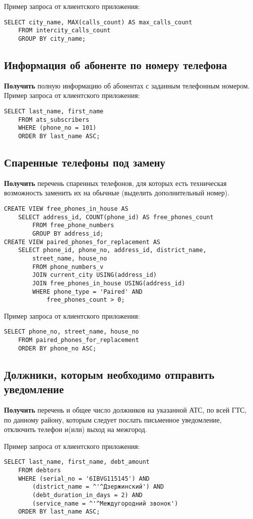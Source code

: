 \documentclass{report}
\begin{document}
Пример запроса от клиентского приложения:

\begin{lstlisting}
SELECT city_name, MAX(calls_count) AS max_calls_count
	FROM intercity_calls_count
	GROUP BY city_name;
\end{lstlisting}

\subsection{Информация об абоненте по номеру телефона}

\textbf{Получить} полную информацию об абонентах с заданным телефонным номером.
Пример запроса от клиентского приложения:

\begin{lstlisting}
SELECT last_name, first_name
	FROM ats_subscribers
	WHERE (phone_no = 101)
	ORDER BY last_name ASC;
\end{lstlisting}

\subsection{Спаренные телефоны под замену}

\textbf{Получить} перечень спаренных телефонов, для которых есть 
техническая возможность заменить их на обычные (выделить дополнительный номер).

\begin{lstlisting}
CREATE VIEW free_phones_in_house AS 
    SELECT address_id, COUNT(phone_id) AS free_phones_count
        FROM free_phone_numbers
        GROUP BY address_id;
CREATE VIEW paired_phones_for_replacement AS 
    SELECT phone_id, phone_no, address_id, district_name,
        street_name, house_no
        FROM phone_numbers_v
        JOIN current_city USING(address_id)
        JOIN free_phones_in_house USING(address_id)
        WHERE phone_type = 'Paired' AND 
            free_phones_count > 0;
\end{lstlisting}

Пример запроса от клиентского приложения:

\begin{lstlisting}
SELECT phone_no, street_name, house_no
	FROM paired_phones_for_replacement
	ORDER BY phone_no ASC;
\end{lstlisting}

\subsection{Должники, которым необходимо отправить уведомление}

\textbf{Получить} перечень и общее число должников на указанной АТС, 
по всей ГТС, по данному району, которым следует послать письменное уведомление, 
отключить телефон и(или) выход на межгород.

Пример запроса от клиентского приложения:

\begin{lstlisting}
SELECT last_name, first_name, debt_amount
	FROM debtors
	WHERE (serial_no = '6IBVG115145') AND
		(district_name = ^'^Дзержинский') AND
		(debt_duration_in_days = 2) AND
		(service_name = ^'^Междугородний звонок')
	ORDER BY last_name ASC;
\end{lstlisting}
\end{document}
